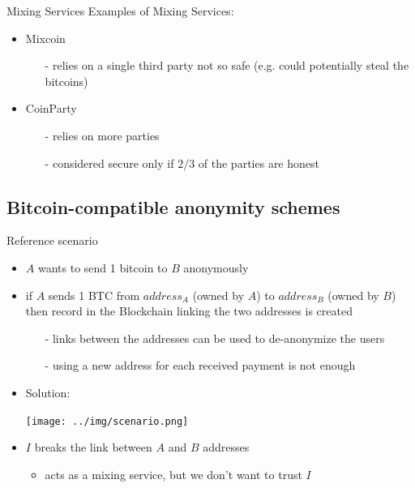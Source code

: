 \documentclass{beamer}
\begin{document}
  
  
  \begin{frame}{Mixing Services}
      Examples of Mixing Services: 
      \begin{itemize}
          \item Mixcoin
          \begin{itemize}
              \item[-] relies on a single third party \MVRightarrow not so safe (e.g. could potentially steal the bitcoins) 
          \end{itemize}
          \item CoinParty
          \begin{itemize}
              \item[-] relies on more parties
              \item[-] considered secure only if $2/3$ of the parties are honest
          \end{itemize}
      \end{itemize}
  \end{frame}
  
  
  \subsection{Bitcoin-compatible anonymity schemes}
  \begin{frame}{Reference scenario}
      \begin{itemize}
          \item $A$ wants to send 1 bitcoin to $B$ anonymously
          \item if $A$ sends 1 BTC from $address_A$ (owned by $A$) to $address_B$ (owned by $B$) then record in the Blockchain linking the two addresses is created
          \begin{itemize}
              \item[-] links between the addresses can be used to de-anonymize the users
              \item[-] using a new address for each received payment is not enough
          \end{itemize} \pause 
          \item Solution:
          \begin{minipage}{\linewidth}
            \texttt{[image: ../img/scenario.png]}
          \end{minipage}
          \item $I$ breaks the link between $A$ and $B$ addresses
          \begin{itemize}
              \item acts as a mixing service, but we don't want to trust $I$
          \end{itemize}
      \end{itemize}
  \end{frame}
  
\end{document}
